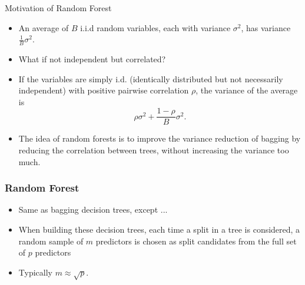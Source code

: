 \documentclass{beamer}
\begin{document}
                     \begin{frame}{Motivation of Random Forest}
                     \begin{itemize}
                     \item An average of $B$ i.i.d random variables, each with variance $\sigma^2$, has variance $\frac{1}{B}\sigma^2$.
                     \item What if not independent but correlated?
                     \item If the variables are simply i.d. (identically distributed but not necessarily independent) with positive pairwise correlation $\rho$, the variance of the average is $$\rho \sigma^2 +\frac{1-\rho}{B}\sigma^2.$$
                     \item The idea of random forests is to improve the variance reduction of bagging by reducing the correlation between trees, without increasing the variance too much.
                   \end{itemize}
                     \end{frame}
                    
                    \begin{frame}
                    	\frametitle{Random Forest  }
                    	\begin{itemize}
                    		\item Same as bagging decision trees, except  ...
                    		\item When building these
                    		decision trees, each time a split in a tree is considered, a random sample of
                    		$m$ predictors is chosen as split candidates from the full set of $p$ predictors
                    		\item  Typically $ m \approx \sqrt{p}$.
                    		 
                    		
                    	\end{itemize}
                    \end{frame} 
                    
\end{document}
